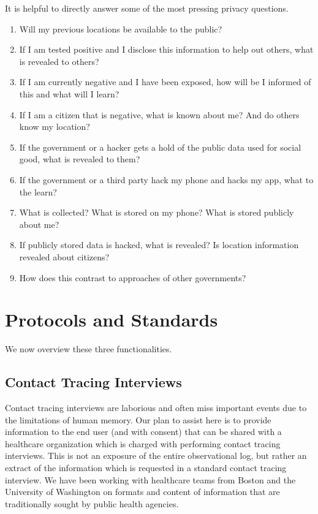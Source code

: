 \documentclass{article}
\begin{document}
It is helpful to directly answer some of the most pressing privacy questions.

\begin{enumerate}
\item Will my previous locations be available to the public?
\item If I am tested positive and I disclose this information to help out others, what is revealed to others?
\item If I am currently negative and I have been exposed, how will be I informed of this and what will I learn?
\item If I am a citizen that is negative, what is known about me? And do others know my location?
\item If the government or a hacker gets a hold of the public data used for social good, what is revealed to them?
\item If the government or a third party hack my phone and hacks my app, what to the learn?
\item What is collected? What is stored on my phone? What is stored publicly about me?
\item If publicly stored data is hacked, what is revealed? Is location information revealed about citizens?
\item How does this contrast to approaches of other governments?
\end{enumerate}

\section{Protocols and Standards} 
We now overview these three functionalities.

\subsection{Contact Tracing Interviews} 
Contact tracing interviews are laborious and often miss important events due to the limitations of human memory.  Our plan to assist here is to provide information to the end user (and with consent) that can be shared with a healthcare organization which is charged with performing contact tracing interviews.   This is not an exposure of the entire observational log, but rather an extract of the information which is requested in a standard contact tracing interview. We have been working with healthcare teams from Boston and the University of Washington on formats and content of information that are traditionally sought by public health agencies.
\end{document}
